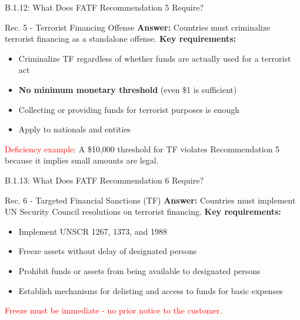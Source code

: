 \documentclass{beamer}
\begin{document}
	\begin{frame}{B.1.12: What Does FATF Recommendation 5 Require?}
		\begin{block}{Rec. 5 - Terrorist Financing Offense}
			\textbf{Answer:} Countries must criminalize terrorist financing as a standalone offense.
			\vspace{0.2cm}
			\textbf{Key requirements:}
			\begin{itemize}
				\item Criminalize TF regardless of whether funds are actually used for a terrorist act
				\item \textbf{No minimum monetary threshold} (even \$1 is sufficient)
				\item Collecting or providing funds for terrorist purposes is enough
				\item Apply to nationals and entities
			\end{itemize}
			\textcolor{red}{Deficiency example:} A \$10,000 threshold for TF violates Recommendation 5 because it implies small amounts are legal.
		\end{block}
	\end{frame}
	
	\begin{frame}{B.1.13: What Does FATF Recommendation 6 Require?}
		\begin{block}{Rec. 6 - Targeted Financial Sanctions (TF)}
			\textbf{Answer:} Countries must implement UN Security Council resolutions on terrorist financing.
			\vspace{0.2cm}
			\textbf{Key requirements:}
			\begin{itemize}
				\item Implement UNSCR 1267, 1373, and 1988
				\item Freeze assets without delay of designated persons
				\item Prohibit funds or assets from being available to designated persons
				\item Establish mechanisms for delisting and access to funds for basic expenses
			\end{itemize}
			\textcolor{red}{Freeze must be immediate - no prior notice to the customer.}
		\end{block}
	\end{frame}
	
\end{document}

